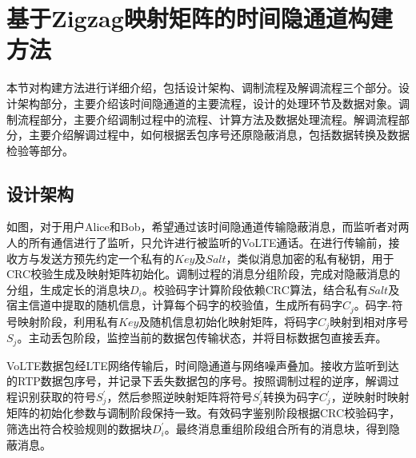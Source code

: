 \section{基于Zigzag映射矩阵的时间隐通道构建方法}
\label{chap:zigzag:model}

本节对构建方法进行详细介绍，包括设计架构、调制流程及解调流程三个部分。设计架构部分，主要介绍该时间隐通道的主要流程，设计的处理环节及数据对象。调制流程部分，主要介绍调制过程中的流程、计算方法及数据处理流程。解调流程部分，主要介绍解调过程中，如何根据丢包序号还原隐蔽消息，包括数据转换及数据检验等部分。

\subsection{设计架构}
\label{chap:zigzag:model:system}


如图，对于用户Alice和Bob，希望通过该时间隐通道传输隐蔽消息，而监听者对两人的所有通信进行了监听，只允许进行被监听的VoLTE通话。在进行传输前，接收方与发送方预先约定一个私有的$Key$及$Salt$，类似消息加密的私有秘钥，用于CRC校验生成及映射矩阵初始化。调制过程的消息分组阶段，完成对隐蔽消息的分组，生成定长的消息块$D_{i}$。校验码字计算阶段依赖CRC算法，结合私有$Salt$及宿主信道中提取的随机信息，计算每个码字的校验值，生成所有码字$C_{j}$。码字-符号映射阶段，利用私有$Key$及随机信息初始化映射矩阵，将码字$C_{j}$映射到相对序号$S_{j}$。主动丢包阶段，监控当前的数据包传输状态，并将目标数据包直接丢弃。

VoLTE数据包经LTE网络传输后，时间隐通道与网络噪声叠加。接收方监听到达的RTP数据包序号，并记录下丢失数据包的序号。按照调制过程的逆序，解调过程识别获取的符号$S_{j}^{'}$，然后参照逆映射矩阵将符号$S_{j}^{'}$转换为码字$C_{j}^{'}$，逆映射时映射矩阵的初始化参数与调制阶段保持一致。有效码字鉴别阶段根据CRC校验码字，筛选出符合校验规则的数据块$D_{i}^{'}$。最终消息重组阶段组合所有的消息块，得到隐蔽消息。

